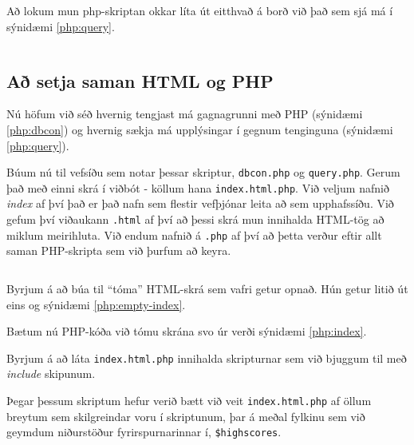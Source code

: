 Að lokum mun php-skriptan okkar líta út eitthvað á borð við það sem sjá má í sýnidæmi \ref{php:query}.

\begin{example}
\caption[Upplýsingar sóttar úr gagnagrunni með PHP]{PDO notað til að sækja upplýsingar úr gagnagrunni og geyma þær í fylkinu \emph{\$highscore}. Athugum að breytan \emph{\$dbh} þarf að vera skilgreind þegar þessi skripta er keyrð, sjá undirkafla \ref{undirkafli:html+php}. Vistum skriptuna í skrá sem við köllum \emph{query.php}.}
\label{php:query}
\centering
\inputminted[frame=lines, fontfamily=courier]{php}{php/query.php}
\end{example}

\subsection{Að setja saman HTML og PHP}
\label{undirkafli:html+php}
Nú höfum við séð hvernig tengjast má gagnagrunni með PHP (sýnidæmi \ref{php:dbcon}) og hvernig sækja má upplýsingar í gegnum tenginguna (sýnidæmi \ref{php:query}).

Búum nú til vefsíðu sem notar þessar skriptur, \verb|dbcon.php| og \verb|query.php|. Gerum það með einni skrá í viðbót - köllum hana \verb|index.html.php|. Við veljum nafnið \emph{index} af því það er það nafn sem flestir vefþjónar leita að sem upphafssíðu. Við gefum því viðaukann \verb|.html| af því að þessi skrá mun innihalda HTML-tög að miklum meirihluta. Við endum nafnið á \verb|.php| af því að þetta verður eftir allt saman PHP-skripta sem við þurfum að keyra.

\begin{example}
\caption[HTML-beinagrind]{HTML beinagrind. Þetta er tóm síða.}
\label{php:empty-index}
\centering
\inputminted[frame=lines, fontfamily=courier]{html}{php/empty-index.html}
\end{example}

Byrjum á að búa til ``tóma'' HTML-skrá sem vafri getur opnað. Hún getur litið út eins og sýnidæmi \ref{php:empty-index}.

Bætum nú PHP-kóða við tómu skrána svo úr verði sýnidæmi \ref{php:index}. 

Byrjum á að láta \verb|index.html.php| innihalda skripturnar sem við bjuggum til með \emph{include} skipunum.

Þegar þessum skriptum hefur verið bætt við veit \verb|index.html.php| af öllum breytum sem skilgreindar voru í skriptunum, þar á meðal fylkinu sem við geymdum niðurstöður fyrirspurnarinnar í, \verb|$highscores|. 

